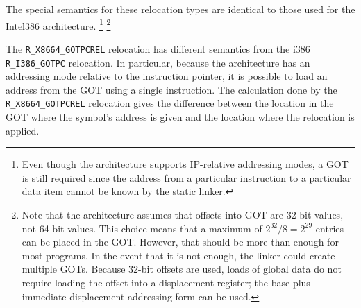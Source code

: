 The special semantics for these relocation types are identical to
those used for the Intel386 architecture.
\footnote{Even though the \xARCH architecture supports IP-relative
  addressing modes, a GOT is still required since the address from
  a particular instruction to a particular data item cannot be
  known by the static linker.}
\footnote{Note that the \xARCH architecture assumes that offsets into
  GOT are 32-bit values, not 64-bit values.  This choice means that a
  maximum of $2^{32}/8 = 2^{29}$ entries can be placed in the GOT.
  However, that should be more than enough for most programs.  In the
  event that it is not enough, the linker could create multiple GOTs.
  Because 32-bit offsets are used, loads of global data do not require
  loading the offset into a displacement register; the base plus
  immediate displacement addressing form can be used.}

The \texttt{R_X8664_GOTPCREL} relocation has different semantics from
the i386 \texttt{R_I386_GOTPC} relocation.  In particular, because the
\xARCH architecture has an addressing mode relative to the instruction
pointer, it is possible to load an address from the GOT using a single
instruction.  The calculation done by the \texttt{R_X8664_GOTPCREL}
relocation gives the difference between the location in the GOT where
the symbol's address is given and the location where the relocation is
applied.

